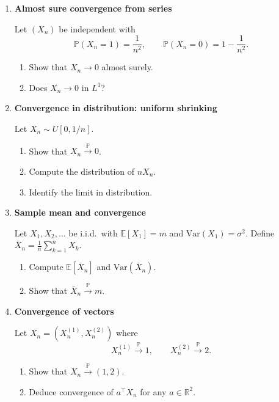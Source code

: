 \documentclass[11pt]{article}
\begin{document}
\begin{enumerate}
\bigskip

\item \textbf{Almost sure convergence from series}

Let $(X_n)$ be independent with
\[
\mathbb{P}(X_n=1)=\frac{1}{n^2},\qquad
\mathbb{P}(X_n=0)=1-\frac{1}{n^2}.
\]

\begin{enumerate}
\item Show that $X_n\to 0$ almost surely.
\item Does $X_n\to 0$ in $L^1$?
\end{enumerate}

\bigskip

\item \textbf{Convergence in distribution: uniform shrinking}

Let $X_n\sim U[0,1/n]$.

\begin{enumerate}
\item Show that $X_n\xrightarrow{\mathbb{P}}0$.
\item Compute the distribution of $nX_n$.
\item Identify the limit in distribution.
\end{enumerate}

\bigskip

\item \textbf{Sample mean and convergence}

Let $X_1,X_2,\dots$ be i.i.d.\ with $\mathbb{E}[X_1]=m$ and $\mathrm{Var}(X_1)=\sigma^2$.
Define $\bar X_n=\frac1n\sum_{k=1}^n X_k$.

\begin{enumerate}
\item Compute $\mathbb{E}[\bar X_n]$ and $\mathrm{Var}(\bar X_n)$.
\item Show that $\bar X_n\xrightarrow{\mathbb{P}} m$.
\end{enumerate}

\bigskip

\item \textbf{Convergence of vectors}

Let $X_n=(X_n^{(1)},X_n^{(2)})$ where
\[
X_n^{(1)}\xrightarrow{\mathbb{P}}1,
\qquad
X_n^{(2)}\xrightarrow{\mathbb{P}}2.
\]

\begin{enumerate}
\item Show that $X_n\xrightarrow{\mathbb{P}}(1,2)$.
\item Deduce convergence of $a^\top X_n$ for any $a\in\mathbb{R}^2$.
\end{enumerate}


\end{enumerate}
\end{document}

